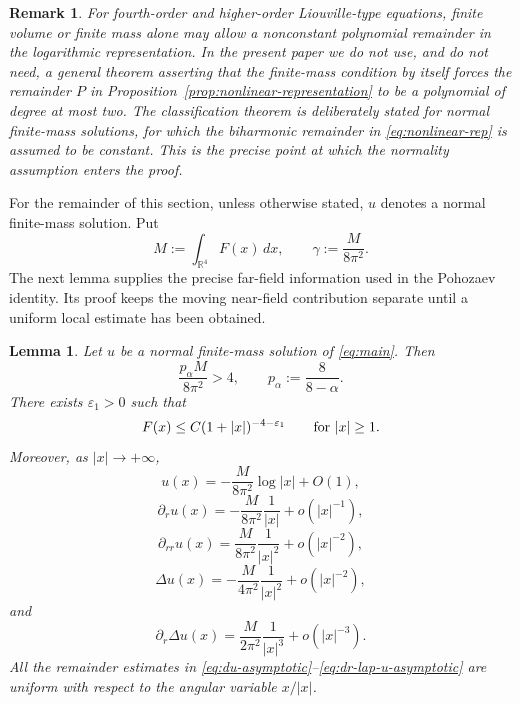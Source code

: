 \documentclass[11pt]{article}
\newtheorem{lemma}[theorem]{Lemma}
\newtheorem{remark}[theorem]{Remark}
\numberwithin{equation}{section}
\begin{document}
\begin{remark}
For fourth-order and higher-order Liouville-type equations, finite volume or finite mass alone may allow a nonconstant polynomial remainder in the logarithmic representation. In the present paper we do not use, and do not need, a general theorem asserting that the finite-mass condition by itself forces the remainder \(P\) in Proposition~\ref{prop:nonlinear-representation} to be a polynomial of degree at most two. The classification theorem is deliberately stated for normal finite-mass solutions, for which the biharmonic remainder in \eqref{eq:nonlinear-rep} is assumed to be constant. This is the precise point at which the normality assumption enters the proof.
\end{remark}

For the remainder of this section, unless otherwise stated, \(u\) denotes a normal finite-mass solution. Put
\[
M:=\int_{\mathbb R^{4}}F(x)\,dx,
\qquad
\gamma:=\frac{M}{8\pi^{2}}.
\]
The next lemma supplies the precise far-field information used in the Pohozaev identity. Its proof keeps the moving near-field contribution separate until a uniform local estimate has been obtained.

\begin{lemma}\label{lem:normal-asymptotics}
Let \(u\) be a normal finite-mass solution of \eqref{eq:main}. Then
\begin{equation}\label{eq:strict-mass-lower}
\frac{p_{\alpha}M}{8\pi^{2}}>4,
\qquad p_{\alpha}:=\frac{8}{8-\alpha}.
\end{equation}
There exists \(\varepsilon_{1}>0\) such that
\begin{equation}\label{eq:F-tail-decay}
F(x)\leq C(1+|x|)^{-4-\varepsilon_{1}}
\qquad\hbox{for }|x|\geq1.
\end{equation}
Moreover, as \(|x|\to+\infty\),
\begin{equation}\label{eq:u-asymptotic}
u(x)=-\frac{M}{8\pi^{2}}\log|x|+O(1),
\end{equation}
\begin{equation}\label{eq:du-asymptotic}
\partial_{r}u(x)=-\frac{M}{8\pi^{2}}\frac1{|x|}+o(|x|^{-1}),
\end{equation}
\begin{equation}\label{eq:drr-u-asymptotic}
\partial_{rr}u(x)=\frac{M}{8\pi^{2}}\frac1{|x|^{2}}+o(|x|^{-2}),
\end{equation}
\begin{equation*}
\Delta u(x)=-\frac{M}{4\pi^{2}}\frac1{|x|^{2}}+o(|x|^{-2}),
\end{equation*}
and
\begin{equation}\label{eq:dr-lap-u-asymptotic}
\partial_{r}\Delta u(x)=\frac{M}{2\pi^{2}}\frac1{|x|^{3}}+o(|x|^{-3}).
\end{equation}
All the remainder estimates in \eqref{eq:du-asymptotic}--\eqref{eq:dr-lap-u-asymptotic} are uniform with respect to the angular variable \(x/|x|\).
\end{lemma}
\end{document}
